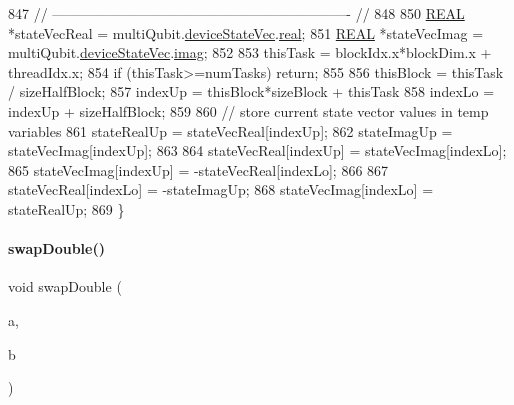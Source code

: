 \begin{DoxyCode}
847     \textcolor{comment}{// ---------------------------------------------------------------- //}
848 
850     \mbox{\hyperlink{QuEST__precision_8h_a4b654506f18b8bfd61ad2a29a7e38c25}{REAL}} *stateVecReal = multiQubit.\mbox{\hyperlink{structMultiQubit_a59ac613486a41b8c9a4b6e79cc8d2cc3}{deviceStateVec}}.\mbox{\hyperlink{structComplexArray_a4195cac6c784ea1b6271f1c7dba1548a}{real}};
851     \mbox{\hyperlink{QuEST__precision_8h_a4b654506f18b8bfd61ad2a29a7e38c25}{REAL}} *stateVecImag = multiQubit.\mbox{\hyperlink{structMultiQubit_a59ac613486a41b8c9a4b6e79cc8d2cc3}{deviceStateVec}}.\mbox{\hyperlink{structComplexArray_a79dde47c7ae530c79cebfdf57b225968}{imag}};
852 
853     thisTask = blockIdx.x*blockDim.x + threadIdx.x;
854     \textcolor{keywordflow}{if} (thisTask>=numTasks) \textcolor{keywordflow}{return};
855 
856     thisBlock   = thisTask / sizeHalfBlock;
857     indexUp     = thisBlock*sizeBlock + thisTask%
858     indexLo     = indexUp + sizeHalfBlock;
859 
860     \textcolor{comment}{// store current state vector values in temp variables}
861     stateRealUp = stateVecReal[indexUp];
862     stateImagUp = stateVecImag[indexUp];
863 
864     stateVecReal[indexUp] = stateVecImag[indexLo];
865     stateVecImag[indexUp] = -stateVecReal[indexLo];
866 
867     stateVecReal[indexLo] = -stateImagUp;
868     stateVecImag[indexLo] = stateRealUp;
869 \}
\end{DoxyCode}
\mbox{\label{QuEST__env__localGPU_8cu_aac328dfe6dd7cceec36a83d989b180b6}} 
\paragraph{\texorpdfstring{swap\+Double()}{swapDouble()}}
{\footnotesize\ttfamily void swap\+Double (\begin{DoxyParamCaption}\item[{\mbox{\hyperlink{QuEST__precision_8h_a4b654506f18b8bfd61ad2a29a7e38c25}{R\+E\+AL}} $\ast$$\ast$}]{a,  }\item[{\mbox{\hyperlink{QuEST__precision_8h_a4b654506f18b8bfd61ad2a29a7e38c25}{R\+E\+AL}} $\ast$$\ast$}]{b }\end{DoxyParamCaption})}




